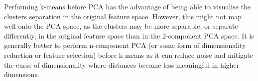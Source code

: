    Performing k-means before PCA has the advantage of being able to visualise the clusters separation in the original
    feature space.
    However, this might not map well onto the PCA space, as the clusters may be more separable, or separate differently,
    in the original feature space than in the 2-component PCA space.
    It is generally better to perform n-component PCA (or some form of dimensionality reduction or feature selection)
    before k-means as it can reduce noise and mitigate the curse of dimensionality \cite{bellman1957} where distances
    become less meaningful in higher dimensions.
